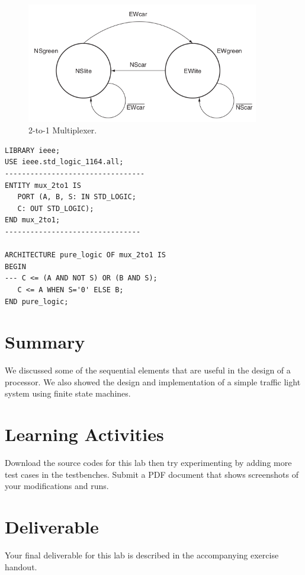 \documentclass[a4paper, 11pt,oneside]{article}
\begin{document}
\begin{figure}[H]
	\begin{center}
	\includegraphics[width=4in]{fsm3.png}
	\caption{2-to-1 Multiplexer.}
	\label{fig:mux} 
	\end{center}
\end{figure}



\begin{verbatim}
LIBRARY ieee;
USE ieee.std_logic_1164.all;
---------------------------------
ENTITY mux_2to1 IS
   PORT (A, B, S: IN STD_LOGIC;
   C: OUT STD_LOGIC);
END mux_2to1;
--------------------------------

ARCHITECTURE pure_logic OF mux_2to1 IS
BEGIN
--- C <= (A AND NOT S) OR (B AND S);                       
   C <= A WHEN S='0' ELSE B;
END pure_logic;
\end{verbatim}





\section{Summary}
We discussed some of the sequential elements that are useful in the design of a 
processor. We also showed the design and implementation of a simple traffic 
light system using finite state machines.

\section{Learning Activities}
Download the source codes for this lab then try experimenting by adding more 
test cases in the testbenches. Submit a PDF document that shows screenshots of 
your modifications and runs. 

\section{Deliverable}
Your final deliverable for this lab is described in the accompanying exercise handout.




\nocite{*}
\end{document}
